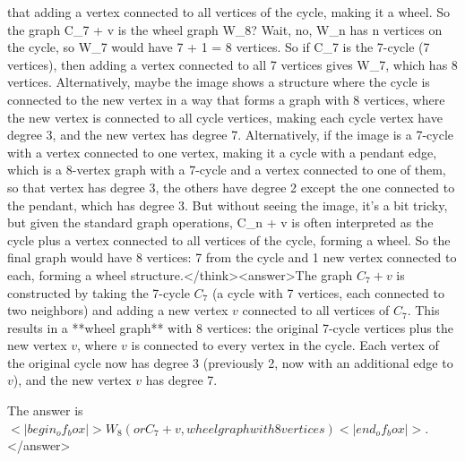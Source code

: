 that adding a vertex connected to all vertices of the cycle, making it a wheel. So the graph C_7 + v is the wheel graph W_8? Wait, no, W_n has n vertices on the cycle, so W_7 would have 7 + 1 = 8 vertices. So if C_7 is the 7-cycle (7 vertices), then adding a vertex connected to all 7 vertices gives W_7, which has 8 vertices. Alternatively, maybe the image shows a structure where the cycle is connected to the new vertex in a way that forms a graph with 8 vertices, where the new vertex is connected to all cycle vertices, making each cycle vertex have degree 3, and the new vertex has degree 7. Alternatively, if the image is a 7-cycle with a vertex connected to one vertex, making it a cycle with a pendant edge, which is a 8-vertex graph with a 7-cycle and a vertex connected to one of them, so that vertex has degree 3, the others have degree 2 except the one connected to the pendant, which has degree 3. But without seeing the image, it's a bit tricky, but given the standard graph operations, C_n + v is often interpreted as the cycle plus a vertex connected to all vertices of the cycle, forming a wheel. So the final graph would have 8 vertices: 7 from the cycle and 1 new vertex connected to each, forming a wheel structure.</think><answer>The graph \( C_7 + v \) is constructed by taking the 7-cycle \( C_7 \) (a cycle with 7 vertices, each connected to two neighbors) and adding a new vertex \( v \) connected to all vertices of \( C_7 \). This results in a **wheel graph** with 8 vertices: the original 7-cycle vertices plus the new vertex \( v \), where \( v \) is connected to every vertex in the cycle. Each vertex of the original cycle now has degree 3 (previously 2, now with an additional edge to \( v \)), and the new vertex \( v \) has degree 7.  

The answer is \(<|begin_of_box|>W_8 (or C_7 + v, wheel graph with 8 vertices)<|end_of_box|>\).</answer>